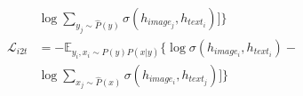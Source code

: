 \begin{align}
	&\log{\underset{y_j\sim \hat{P} (y)}{\sum} \sigma(h_{image_j}, h_{text_i})}] \} \label{eq:t2i} \\
	\nonumber
	\mathcal{L}_{i2t}&=-\mathbb{E}_{y_i,x_i\sim P(y)P(x|y)}\{\log{\sigma(h_{image_i}, h_{text_i                                                                                                                                                                                                                                                                                                                                                                                                                                                                                                                                                                                                                                                                                                                                                                                                                                                                                                                                                                                                                                                                                                                                                                                                                                                                                                                                                                                                                                                                                                                                                                                                                                                                                                                                                                                                                                                                                                                                                                                                                                                                                                                                                                                                                                                                                                                                                                                                                                                                                                                                                                                                                                                                                                                                                                                                                                                                                    })}-\\ 
	&\log{\underset{x_j\sim \hat{P} (x)}{\sum} \sigma(h_{image_i}, h_{text_j})}] \} \label{eq:i2t}
\end{align}
